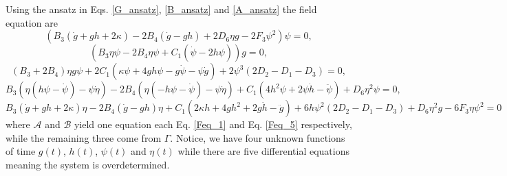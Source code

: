 Using the ansatz in Eqs. \eqref{G_ansatz}, \eqref{B_ansatz} and \eqref{A_ansatz} the field equation are
\begin{dmath}
    \label{Feq_1}
    \left(B_3\left(\dot{g} + gh + 2\kappa\right) - 2B_4\left(\dot{g} - gh\right) + 2D_6\eta g - 2F_3\psi^2\right)\psi = 0,
\end{dmath}
\begin{dmath}
    \label{Feq_2}
    \left(B_3\eta\psi -2B_4\eta\psi + C_1\left(\dot{\psi} - 2h\psi\right)\right)g = 0,
\end{dmath}
\begin{dmath}
    \label{Feq_3}
    \left(B_3 + 2B_4\right)\eta g\psi + 2C_1\left(\kappa\psi + 4gh\psi - g\dot{\psi} - \psi\dot{g}\right) + 2\psi^3\left(2D_2 - D_1 - D_3\right) = 0,
\end{dmath}
\begin{dmath}
    \label{Feq_4}
    B_3\left(\eta\left(h\psi - \dot{\psi}\right) -\psi\dot{\eta}\right) - 2B_4\left(\eta\left(-h\psi - \dot{\psi}\right) -\psi\dot{\eta}\right) 
    + C_1\left(4h^2\psi + 2\psi\dot{h} -\ddot{\psi}\right) + D_6\eta^2\psi = 0,
\end{dmath}
\begin{dmath}
    \label{Feq_5}
    B_3\left(\dot{g} + gh + 2\kappa\right)\eta - 2B_4\left(\dot{g} - gh\right)\eta + C_1\left(2\kappa h + 4gh^2 + 2g\dot{h} - \ddot{g}\right) +
    6h\psi^2\left(2D_2 - D_1 - D_3\right) + D_6 \eta^2 g - 6F_3\eta\psi^2 = 0
\end{dmath}
where $\mathcal{A}$ and $\mathcal{B}$ yield one equation each Eq. \eqref{Feq_1} and Eq. \eqref{Feq_5} respectively, 
while the remaining three come from $\Gamma$. Notice, we have four unknown functions 
of time $g(t)$, $h(t)$, $\psi(t)$ and $\eta(t)$ while there are five differential equations meaning the system is overdetermined.


